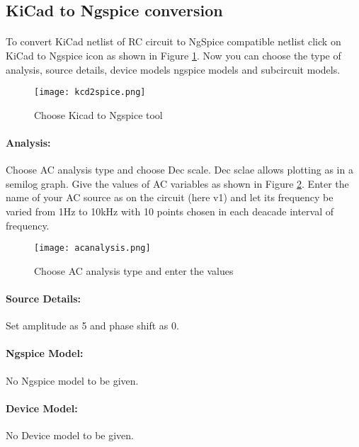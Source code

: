 \subsection{KiCad to Ngspice conversion}

\paragraph{} To convert KiCad netlist of RC circuit to NgSpice
compatible netlist click on KiCad to Ngspice icon as shown in Figure \ref{kcd2spice}.  Now you can choose the type of analysis, source details, device models ngspice models and subcircuit models.


\begin{figure}[h]
\centering
\texttt{[image: kcd2spice.png]}
\caption{Choose Kicad to Ngspice tool}
\label{kcd2spice}
\end{figure}


\paragraph{Analysis:}Choose AC analysis type and choose Dec scale. Dec sclae allows plotting as in a semilog graph.  Give the values of AC variables as shown in Figure \ref{acanalysis}. Enter the name of your AC source as on the circuit (here v1) and let its frequency be varied from 1Hz to 10kHz with 10 points chosen in each deacade interval of frequency.

\begin{figure}[h]
\centering
\texttt{[image: acanalysis.png]}
\caption{Choose AC analysis type and enter the values}
\label{acanalysis}
\end{figure}

\paragraph{Source Details:} Set amplitude as 5 and phase shift as 0.

\paragraph{Ngspice Model:} No Ngspice model to be given.

\paragraph{Device Model:} No Device model to be given.

